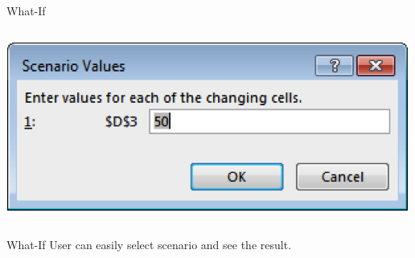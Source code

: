 \documentclass[xcolor=svgnames, handout]{beamer}
\begin{document}
\begin{frame}{What-If}
\begin{columns}[T]
\begin{column}{.48\textwidth}
\hspace*{-6mm}\includegraphics[width=.9\textwidth]{whatif3.png}
\end{column}%
\end{columns}
\end{frame}




\begin{frame}{What-If}
User can easily select scenario and see the result.
\begin{center}
\end{center}

\end{frame}
\end{document}
